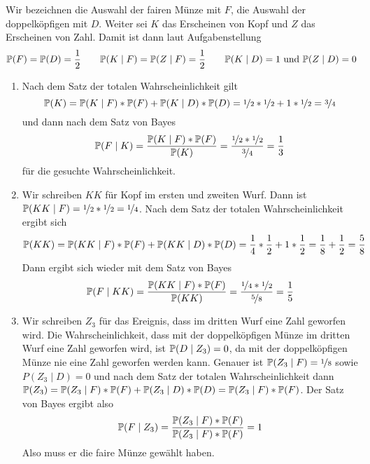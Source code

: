 \begin{exercisePage}
	Wir bezeichnen die Auswahl der fairen Münze mit $F$, die Auswahl der doppelköpfigen mit $D$. Weiter sei $K$ das Erscheinen von Kopf und $Z$ das Erscheinen von Zahl. Damit ist dann laut Aufgabenstellung
		\begin{equation*}
			\P(F) = \P(D) = \frac{1}{2} \qquad
			\P(K \mid F) = \P( Z \mid F) = \frac{1}{2} \qquad
			\P(K \mid D) = 1 \und \P(Z \mid D) = 0
		\end{equation*}
	\begin{enumerate}[leftmargin=*, label=(zu \alph*)]
		\item Nach dem Satz der totalen Wahrscheinlichkeit gilt
		\begin{equation*}
			\P(K) = \P(K \mid F) * \P(F) + \P(K \mid D) * \P(D) = \lfrac{1}{2} * \lfrac{1}{2} + 1 * \lfrac{1}{2} = \lfrac{3}{4}
		\end{equation*}
		und dann nach dem Satz von Bayes
		\begin{equation*}
			\P(F \mid K) = \frac{\P(K \mid F) * \P(F)}{\P(K)} = \frac{\lfrac{1}{2} * \lfrac{1}{2}}{\lfrac{3}{4}} = \frac{1}{3}
		\end{equation*}
		für die gesuchte Wahrscheinlichkeit.
		\item Wir schreiben $KK$ für Kopf im ersten und zweiten Wurf. Dann ist $\P(KK \mid F) = \lfrac{1}{2} * \lfrac{1}{2} = \lfrac{1}{4}$. Nach dem Satz der totalen Wahrscheinlichkeit ergibt sich
		\begin{equation*}
			\P (KK) = \P( KK \mid F) * \P(F) + \P(KK \mid D) * \P(D) = \frac{1}{4} * \frac{1}{2} + 1 * \frac{1}{2} = \frac{1}{8} + \frac{1}{2} = \frac{5}{8}
		\end{equation*}
		Dann ergibt sich wieder mit dem Satz von Bayes
		\begin{equation*}
			\P(F \mid KK) = \frac{\P(KK \mid F) * \P(F)}{\P(KK)} = \frac{\lfrac{1}{4} * \lfrac{1}{2}}{\lfrac{5}{8}} = \frac{1}{5}
		\end{equation*}
		\item Wir schreiben $Z_3$ für das Ereignis, dass im dritten Wurf eine Zahl geworfen wird. Die Wahrscheinlichkeit, dass mit der doppelköpfigen Münze im dritten Wurf eine Zahl geworfen wird, ist $\P(D \mid Z_3) = 0$, da mit der doppelköpfigen Münze nie eine Zahl geworfen werden kann. Genauer ist $\P(Z_3 \mid F) = \lfrac{1}{8}$ sowie $P(Z_3 \mid D) = 0$ und nach dem Satz der totalen Wahrscheinlichkeit dann $\P(Z_3) = \P(Z_3 \mid F) * \P(F) + \P(Z_3 \mid D) * \P(D) = \P(Z_3 \mid F) * \P(F)$. Der Satz von Bayes ergibt also
		\begin{equation*}
			\P( F \mid Z_3) = \frac{\P(Z_3 \mid F) * \P(F)}{\P(Z_3 \mid F) * \P(F)} = 1
		\end{equation*}
		Also muss er die faire Münze gewählt haben.
	\end{enumerate}


\end{exercisePage}
